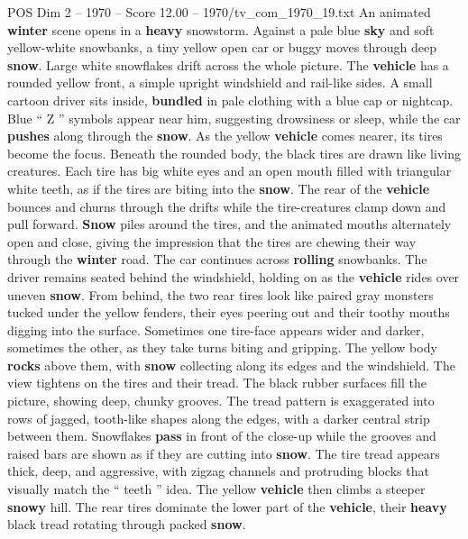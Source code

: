 \begin{textsample}{POS Dim 2 – 1970 – Score 12.00 – 1970/tv\_com\_1970\_19.txt}  \label{ex:f2_pos_079}
An animated \textbf{winter} scene opens in a \textbf{heavy} snowstorm.
Against a pale blue \textbf{sky} and soft yellow-white snowbanks, a tiny yellow open car or buggy moves through deep \textbf{snow}.
Large white snowflakes drift across the whole picture.
The \textbf{vehicle} has a rounded yellow front, a simple upright windshield and rail-like sides.
A small cartoon driver sits inside, \textbf{bundled} in pale clothing with a blue cap or nightcap.
Blue “ Z ” symbols appear near him, suggesting drowsiness or sleep, while the car \textbf{pushes} along through the \textbf{snow}.
As the yellow \textbf{vehicle} comes nearer, its tires become the focus.
Beneath the rounded body, the black tires are drawn like living creatures.
Each tire has big white eyes and an open mouth filled with triangular white teeth, as if the tires are biting into the \textbf{snow}.
The rear of the \textbf{vehicle} bounces and churns through the drifts while the tire-creatures clamp down and pull forward. \textbf{Snow} piles around the tires, and the animated mouths alternately open and close, giving the impression that the tires are chewing their way through the \textbf{winter} road.
The car continues across \textbf{rolling} snowbanks.
The driver remains seated behind the windshield, holding on as the \textbf{vehicle} rides over uneven \textbf{snow}.
From behind, the two rear tires look like paired gray monsters tucked under the yellow fenders, their eyes peering out and their toothy mouths digging into the surface.
Sometimes one tire-face appears wider and darker, sometimes the other, as they take turns biting and gripping.
The yellow body \textbf{rocks} above them, with \textbf{snow} collecting along its edges and the windshield.
The view tightens on the tires and their tread.
The black rubber surfaces fill the picture, showing deep, chunky grooves.
The tread pattern is exaggerated into rows of jagged, tooth-like shapes along the edges, with a darker central strip between them.
Snowflakes \textbf{pass} in front of the close-up while the grooves and raised bars are shown as if they are cutting into \textbf{snow}.
The tire tread appears thick, deep, and aggressive, with zigzag channels and protruding blocks that visually match the “ teeth ” idea.
The yellow \textbf{vehicle} then climbs a steeper \textbf{snowy} hill.
The rear tires dominate the lower part of the \textbf{vehicle}, their \textbf{heavy} black tread rotating through packed \textbf{snow}.

\end{textsample}
